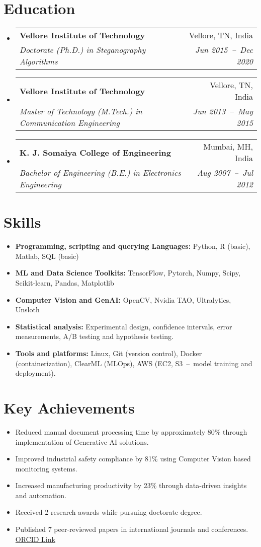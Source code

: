 \documentclass[a4paper,11pt]{article}
\makeatletter
\newcommand{\resumeSubheading}[4]{
  \vspace{-1pt}\item
    \begin{tabular*}{0.97\textwidth}[t]{l@{\extracolsep{\fill}}r}
      \textbf{#1} & #2 \\
      \textit{\small#3} & \textit{\small #4} \\
    \end{tabular*}\vspace{-5pt}
}
\newcommand{\resumeSubHeadingListStart}{\begin{itemize}[leftmargin=*]}
\newcommand{\resumeSubHeadingListEnd}{\end{itemize}}
\makeatother
\begin{document}
\section{Education}
  \resumeSubHeadingListStart
    \resumeSubheading
      {Vellore Institute of Technology}{Vellore, TN, India}
      {Doctorate (Ph.D.) in Steganography Algorithms}{Jun 2015~--~Dec 2020}
    \resumeSubheading
      {Vellore Institute of Technology}{Vellore, TN, India}
      {Master of Technology (M.Tech.) in Communication Engineering}{Jun 2013~--~May 2015}
    \resumeSubheading
      {K. J. Somaiya College of Engineering}{Mumbai, MH, India}
      {Bachelor of Engineering (B.E.) in Electronics Engineering}{Aug 2007~--~Jul 2012}
  \resumeSubHeadingListEnd

\section{Skills}
	\begin{itemize}[leftmargin=*, itemsep = -2pt]
    \item{\textbf{Programming, scripting and querying Languages:} Python, R (basic), Matlab, SQL (basic)}
		\item{\textbf{ML and Data Science Toolkits:} TensorFlow, Pytorch, Numpy, Scipy, Scikit-learn, Pandas, Matplotlib}
		\item{\textbf{Computer Vision and GenAI:} OpenCV, Nvidia TAO, Ultralytics, Unsloth}
		\item{\textbf{Statistical analysis:} Experimental design, confidence intervals, error measurements, A/B testing and hypothesis testing.}
    \item{\textbf{Tools and platforms:} Linux, Git (version control), Docker (containerization), ClearML (MLOps), AWS (EC2, S3~--~model training and deployment).}
	\end{itemize}

\section{Key Achievements}
  \begin{itemize}[leftmargin=*, itemsep = -4pt]
    \item{Reduced manual document processing time by approximately 80\% through implementation of Generative AI solutions.}
    \item{Improved industrial safety compliance by 81\% using Computer Vision based monitoring systems.}
    \item{Increased manufacturing productivity by 23\% through data-driven insights and automation.}
    \item{Received 2 research awards while pursuing doctorate degree.}
    \item{Published 7 peer-reviewed papers in international journals and conferences. \href{https://orcid.org/0000-0002-2247-9046}{ORCID Link}}
  \end{itemize}
\end{document}
